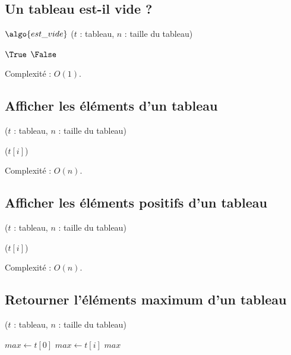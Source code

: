 


\subsection{Un tableau est-il vide ?}
\begin{algorithm}[H]
\caption{$\algo{est\_vide}$ ($t$ : tableau, $n$ : taille du tableau)}
\begin{algorithmic}[1]
	\State\Return $\True$
\Else
	\State\Return $\False$
\EndIf
\end{algorithmic}
\end{algorithm}

Complexité : $O(1)$.


\subsection{Afficher les éléments d'un tableau}
\begin{algorithm}[H]
\caption{ ($t$ : tableau, $n$ : taille du tableau)}
\begin{algorithmic}[1]
	\State \print($t[i]$)
\EndFor
\end{algorithmic}
\end{algorithm}

Complexité : $O(n)$.


\subsection{Afficher les éléments positifs d'un tableau}
\begin{algorithm}[H]
\caption{ ($t$ : tableau, $n$ : taille du tableau)}
\begin{algorithmic}[1]
		\State \print($t[i]$)
	\EndIf
\EndFor
\end{algorithmic}
\end{algorithm}

Complexité : $O(n)$.


\subsection{Retourner l'éléments maximum d'un tableau}
\begin{algorithm}[H]
\caption{ ($t$ : tableau, $n$ : taille du tableau)}
\begin{algorithmic}[1]
\State {}
\State $max \gets t[0]$ 
		\State $max \gets t[i]$
	\EndIf
\EndFor
\State\Return $max$
\end{algorithmic}
\end{algorithm}


